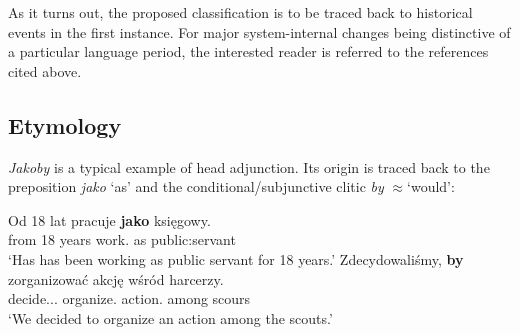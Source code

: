\documentclass[output=paper]{langsci/langscibook}
\begin{document}
\noindent As it turns out, the proposed classification is to be traced back to historical events in the first instance. For major system-internal changes being distinctive of a particular language period, the interested reader is referred to the references cited above.

\subsection{Etymology}

\emph{Jakoby} is a typical example of head adjunction. Its origin is traced back to the preposition \emph{jako} `as' and the conditional\slash subjunctive clitic \emph{by} $\approx$`would':

\ea \ea \gll	Od 18 lat pracuje \textbf{jako} księgowy. \\
		from 18 years work.{\thirdperson}{\sg} as {public:servant} \\
		\glt	`Has has been working as public servant for 18 years.' 
		\ex\gll		Zdecydowaliśmy, \textbf{by} zorganizować akcję wśród harcerzy. \label{pasek} \\
	            decide.{\lptcp}.{\vir}.{\firstperson}{\pl} {\subj} organize.{\infv} action.{\acc} among scours \\
		\glt	 `We decided to organize an action among the scouts.' 
    \z\z
\end{document}

